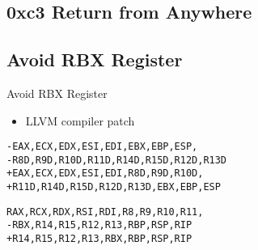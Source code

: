 \documentclass[14pt]{beamer}
\begin{document}
\subsection{0xc3 Return from Anywhere}

\subsection{Avoid RBX Register}
\begin{frame}[fragile]{Avoid RBX Register}
\begin{itemize}
    \item LLVM compiler patch
\end{itemize}
\begin{alltt}
-EAX,ECX,EDX,ESI,EDI,{\color{red}EBX},EBP,ESP,
-R8D,R9D,R10D,R11D,R14D,R15D,R12D,R13D
+EAX,ECX,EDX,ESI,EDI,R8D,R9D,R10D,
+R11D,R14D,R15D,R12D,R13D,{\color{red}EBX},EBP,ESP
\end{alltt}
\begin{alltt}
 RAX,RCX,RDX,RSI,RDI,R8,R9,R10,R11,
-{\color{red}RBX},R14,R15,R12,R13,RBP,RSP,RIP
+R14,R15,R12,R13,{\color{red}RBX},RBP,RSP,RIP
\end{alltt}
\end{frame}
\end{document}
